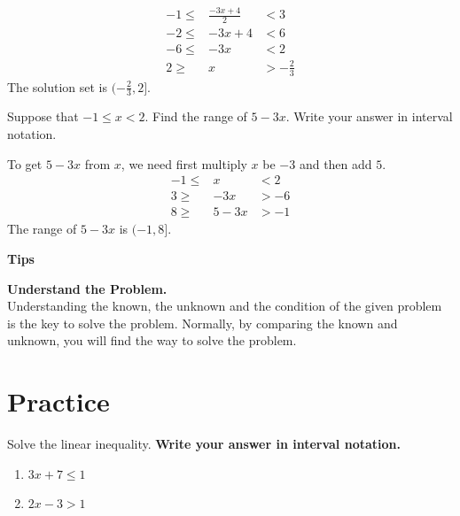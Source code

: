 \documentclass[en,12pt]{elegantbook}
\providecommand{\tightlist}{%
  \setlength{\itemsep}{0pt}\setlength{\parskip}{0pt}}
\newenvironment{rmdtip}{
	\par\noindent
	{
		\makebox[-\width][r]{
			\footnotesize\color{red!90}
            \HandRight
			\hspace*{1pt}
		}
			\textbf{
				\color{second}
				\hspace*{3pt}
				Tips 
			}
    }
    \begin{shaded}
    \sffamily
}{
    \par\medskip\ignorespacesafterend
    \end{shaded}
}
\providecommand{\tightlist}{%
  \setlength{\itemsep}{0pt}\setlength{\parskip}{0pt}}
\let\BeginKnitrBlock\begin \let\EndKnitrBlock\end
\begin{document}
\BeginKnitrBlock{solution}


\[
\begin{array}{rcl}
    -1\leq & \frac{-3x+4}{2}  & <3        \\
    -2\leq & -3x+4          & <6        \\
    -6\leq & -3x           & <2        \\
    2\geq  & x            & >-\frac23
\end{array}
\]
The solution set is \((-\frac23, 2]\).
\EndKnitrBlock{solution}

\BeginKnitrBlock{example}
\protect\hypertarget{exm:unnamed-chunk-206}{}{\label{exm:unnamed-chunk-206} }
Suppose that \(-1\le x < 2\). Find the range of \(5-3x\). Write your answer in interval notation.
\EndKnitrBlock{example}

\BeginKnitrBlock{solution}


To get \(5-3x\) from \(x\), we need first multiply \(x\) be \(-3\) and then add \(5\).
\[
\begin{array}{rcl}
-1\leq & x          & < 2        \\
3\geq & -3x         & >-6        \\
8\geq & 5-3x      & >-1
\end{array}
\]
The range of \(5-3x\) is \((-1, 8]\).
\EndKnitrBlock{solution}

\begin{rmdtip}

\textbf{Understand the Problem.}\\
Understanding the known, the unknown and the condition of the given problem is the key to solve the problem. Normally, by comparing the known and unknown, you will find the way to solve the problem.

\end{rmdtip}

\hypertarget{practice-9}{%
\section{Practice}\label{practice-9}}

\BeginKnitrBlock{exercise}
\protect\hypertarget{exr:unnamed-chunk-208}{}{\label{exr:unnamed-chunk-208} }
Solve the linear inequality. \textbf{Write your answer in interval notation.}

\begin{enumerate}
\def\labelenumi{\arabic{enumi}.}
\tightlist
\item
  \(3x + 7 \leq 1\)
\item
  \(2x-3>1\)
\end{enumerate}
\EndKnitrBlock{exercise}
\end{document}
